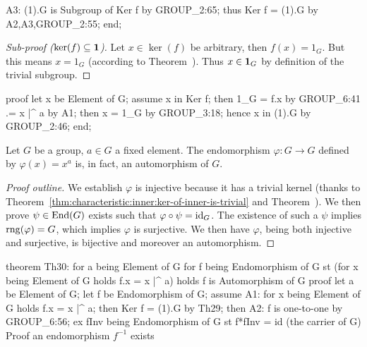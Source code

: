   A3: (1).G is Subgroup of Ker f by GROUP_2:65;
  thus Ker f = (1).G by A2,A3,GROUP_2:55;
end;
\eatline
{}\nwendcode{}\nwdocspar
\begin{proof}[Sub-proof ($\ker(f)\subseteq\mathbf{1}$)]
Let $x\in\ker(f)$ be arbitrary, then $f(x)=1_{G}$. But this means $x=1_{G}$
(according to Theorem~). Thus
$x\in\mathbf{1}_{G}$ by definition of the trivial subgroup.
\end{proof}

\nwenddocs{}\endmoddef\nwstartdeflinemarkup{}\nwenddeflinemarkup
proof
  let x be Element of G;
  assume x in Ker f;
  then 1_G = f.x by GROUP_6:41
          .= x |^ a by A1;
  then x = 1_G by GROUP_3:18;
  hence x in (1).G by GROUP_2:46;
end;
\nwendcode{}\nwdocspar

\begin{theorem}\label{thm:characteristic:inner:conjugation-by-fixed-element-is-an-automorphism}
Let $G$ be a group, $a\in G$ a fixed element.
The endomorphism $\varphi\colon G\to G$ defined by $\varphi(x)=x^{a}$ is, in fact,
an automorphism of $G$.
\end{theorem}

\begin{proof}[Proof outline]
We establish $\varphi$ is injective because it has a trivial kernel
(thanks to Theorem~\ref{thm:characteristic:inner:ker-of-inner-is-trivial} and
Theorem~).
We then prove $\psi\in\operatorname{End}(G)$ exists such that $\varphi\circ\psi=\operatorname{id}_{G}$.
The existence of such a $\psi$ implies $\operatorname{rng}(\varphi)=G$, which implies
$\varphi$ is surjective. We then have $\varphi$, being both injective
and surjective, is bijective and moreover an automorphism.
\end{proof}

\nwenddocs{}\endmoddef\nwstartdeflinemarkup{}\nwenddeflinemarkup
theorem Th30:
  for a being Element of G
  for f being Endomorphism of G
  st (for x being Element of G holds f.x = x |^ a)
  holds f is Automorphism of G
proof
  let a be Element of G;
  let f be Endomorphism of G;
  assume A1: for x being Element of G holds f.x = x |^ a;
  then Ker f = (1).G by Th29;
  then A2: f is one-to-one by GROUP_6:56;
  ex fInv being Endomorphism of G st f*fInv = id (the carrier of G)
  \LA{}Proof an endomorphism $f^{-1}$ exists~{\nwtagstyle{}}\RA{}

